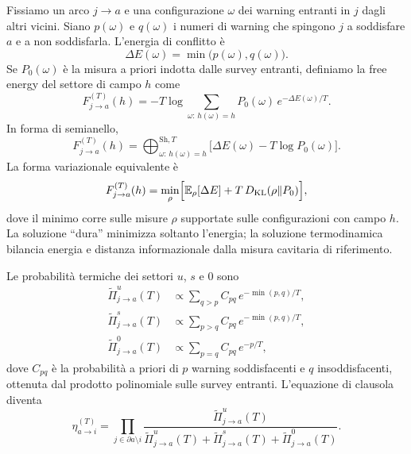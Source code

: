 \documentclass{article}
\newcommand{\E}{\mathbb{E}}
\begin{document}
Fissiamo un arco $j\to a$ e una configurazione $\omega$ dei warning entranti in $j$ dagli altri vicini.
Siano $p(\omega)$ e $q(\omega)$ i numeri di warning che spingono $j$ a soddisfare $a$ e a non soddisfarla.
L'energia di conflitto \`e
\begin{equation}
  \Delta E(\omega)=\min\bigl(p(\omega),q(\omega)\bigr).
\end{equation}
Se $P_0(\omega)$ \`e la misura a priori indotta dalle survey entranti, definiamo la free energy del settore di campo $h$ come
\begin{equation}
  F^{(T)}_{j\to a}(h)
  =-T\log\sum_{\omega:\,h(\omega)=h}
  P_0(\omega)\,e^{-\Delta E(\omega)/T}.
  \label{eq:F-thermo}
\end{equation}
In forma di semianello,
\begin{equation}
  F^{(T)}_{j\to a}(h)
  =\bigoplus_{\omega:\,h(\omega)=h}^{\mathrm{Sh},T}
  \bigl[\Delta E(\omega)-T\log P_0(\omega)\bigr].
\end{equation}
La forma variazionale equivalente \`e
\begin{equation}
  F^{(T)}_{j\to a}(h)
  =\min_{\rho}
  \Bigl[
  \E_{\rho}[\Delta E]+T\,D_{\mathrm{KL}}(\rho\Vert P_0)
  \Bigr],
\end{equation}
dove il minimo corre sulle misure $\rho$ supportate sulle configurazioni con campo $h$.
La soluzione ``dura'' minimizza soltanto l'energia; la soluzione termodinamica bilancia energia e distanza informazionale dalla misura cavitaria di riferimento.

Le probabilit\`a termiche dei settori $u$, $s$ e $0$ sono
\begin{align}
  \widetilde{\Pi}^{u}_{j\to a}(T)
  &\propto\sum_{q>p}C_{pq}\,e^{-\min(p,q)/T},\\
  \widetilde{\Pi}^{s}_{j\to a}(T)
  &\propto\sum_{p>q}C_{pq}\,e^{-\min(p,q)/T},\\
  \widetilde{\Pi}^{0}_{j\to a}(T)
  &\propto\sum_{p=q}C_{pq}\,e^{-p/T},
\end{align}
dove $C_{pq}$ \`e la probabilit\`a a priori di $p$ warning soddisfacenti e $q$ insoddisfacenti, ottenuta dal prodotto polinomiale sulle survey entranti.
L'equazione di clausola diventa
\begin{equation}
  \eta^{(T)}_{a\to i}
  =\prod_{j\in\partial a\setminus i}
  \frac{\widetilde{\Pi}^{u}_{j\to a}(T)}
  {\widetilde{\Pi}^{u}_{j\to a}(T)
  +\widetilde{\Pi}^{s}_{j\to a}(T)
  +\widetilde{\Pi}^{0}_{j\to a}(T)}.
  \label{eq:thermo-eta}
\end{equation}
\end{document}
